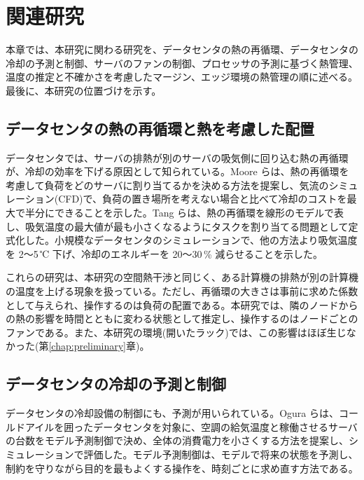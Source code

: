 \chapter{関連研究}\label{chap:related}

本章では、本研究に関わる研究を、データセンタの熱の再循環、データセンタの冷却の予測と制御、サーバのファンの制御、プロセッサの予測に基づく熱管理、温度の推定と不確かさを考慮したマージン、エッジ環境の熱管理の順に述べる。最後に、本研究の位置づけを示す。

\section{データセンタの熱の再循環と熱を考慮した配置}\label{sec:rel-recirc}
データセンタでは、サーバの排熱が別のサーバの吸気側に回り込む熱の再循環が、冷却の効率を下げる原因として知られている。Moore ら\cite{moore2005cool}は、熱の再循環を考慮して負荷をどのサーバに割り当てるかを決める方法を提案し、気流のシミュレーション(CFD)で、負荷の置き場所を考えない場合と比べて冷却のコストを最大で半分にできることを示した。Tang ら\cite{tang2008sensor}は、熱の再循環を線形のモデルで表し、吸気温度の最大値が最も小さくなるようにタスクを割り当てる問題として定式化した。小規模なデータセンタのシミュレーションで、他の方法より吸気温度を 2〜5\,℃ 下げ、冷却のエネルギーを 20〜30\,\% 減らせることを示した。

これらの研究は、本研究の空間熱干渉と同じく、ある計算機の排熱が別の計算機の温度を上げる現象を扱っている。ただし、再循環の大きさは事前に求めた係数として与えられ、操作するのは負荷の配置である。本研究では、隣のノードからの熱の影響を時間とともに変わる状態として推定し、操作するのはノードごとのファンである。また、本研究の環境(開いたラック)では、この影響はほぼ生じなかった(第\ref{chap:preliminary}章)。

\section{データセンタの冷却の予測と制御}\label{sec:rel-dc-mpc}
データセンタの冷却設備の制御にも、予測が用いられている。Ogura ら\cite{ogura2018mpc}は、コールドアイルを囲ったデータセンタを対象に、空調の給気温度と稼働させるサーバの台数をモデル予測制御で決め、全体の消費電力を小さくする方法を提案し、シミュレーションで評価した。モデル予測制御は、モデルで将来の状態を予測し、制約を守りながら目的を最もよくする操作を、時刻ごとに求め直す方法である。

